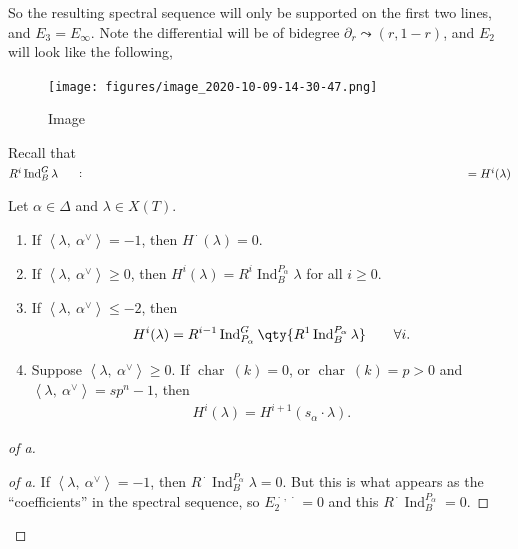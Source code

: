So the resulting spectral sequence will only be supported on the first
two lines, and \(E_3 = E_\infty\). Note the differential will be of
bidegree \({\partial}_r \leadsto (r, 1-r)\), and \(E_2\) will look like
the following,

\begin{figure}
\centering
\texttt{[image: figures/image\_2020-10-09-14-30-47.png]}
\caption{Image}
\end{figure}

Recall that
\(R^i \operatorname{Ind}_B^G \lambda \mathrel{\vcenter{:}}= H^i(\lambda)\)

\begin{proposition}[?]

\begin{proposition}[?]

Let \(\alpha\in\Delta\) and \(\lambda \in X(T)\).

\begin{enumerate}
\def\labelenumi{\arabic{enumi}.}
\item
  If \({\left\langle {\lambda},~{\alpha^\vee} \right\rangle} = -1\),
  then \(H^{\,\cdot\,}(\lambda) = 0\).
\item
  If \({\left\langle {\lambda},~{ \alpha^\vee} \right\rangle} \geq 0\),
  then \(H^i(\lambda) = R^i \operatorname{Ind}_B^{P_\alpha} \lambda\)
  for all \(i\geq 0\).
\item
  If \({\left\langle {\lambda},~{\alpha^\vee} \right\rangle} \leq -2\),
  then
  \begin{align*}       H^i(\lambda) = R^{i-1} \operatorname{Ind}_{P_\alpha}^G \qty{ R^1 \operatorname{Ind}_B^{P_\alpha} \lambda } \qquad \forall i     .\end{align*}
\item
  Suppose
  \({\left\langle {\lambda},~{\alpha^\vee} \right\rangle} \geq 0\). If
  \(\operatorname{char}~(k) = 0\), or \(\operatorname{char}~(k) = p> 0\)
  and
  \({\left\langle {\lambda},~{\alpha^\vee} \right\rangle} = sp^n - 1\),
  then
  \begin{align*}         H^i(\lambda) = H^{i+1}(s_\alpha\cdot \lambda)       .\end{align*}
\end{enumerate}

\end{proposition}

\end{proposition}

\begin{proof}[of a]

\begin{proof}[of a]

If \({\left\langle {\lambda},~{\alpha^\vee} \right\rangle} = -1\), then
\(R^{\,\cdot\,}\operatorname{Ind}_B^{P_\alpha} \lambda = 0\). But this
is what appears as the ``coefficients'' in the spectral sequence, so
\(E_2^{{\,\cdot\,}, {\,\cdot\,}} = 0\) and this
\(R^{\,\cdot\,}\operatorname{Ind}_B^{P_\alpha} = 0\).

\end{proof}

\end{proof}

